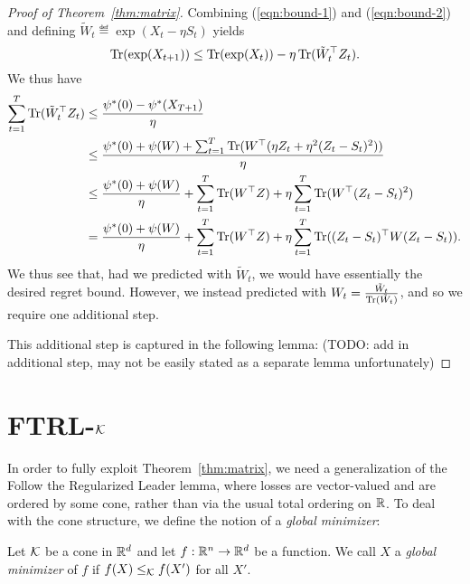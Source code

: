\documentclass[11pt]{article}
\begin{document}
\begin{proof}[Proof of Theorem~\ref{thm:matrix}]
Combining (\ref{eqn:bound-1}) and (\ref{eqn:bound-2}) and defining $\tilde{W}_t \eqdef \exp(X_t - \eta S_t)$ yields
\begin{equation}
\label{eqn:bound-3}
\operatorname{Tr}(\exp(X_{t+1})) \leq \operatorname{Tr}(\exp(X_t)) - \eta \operatorname{Tr}(\tilde{W}_t^{\top}Z_t).
\end{equation}
We thus have
\begin{align}
\sum_{t=1}^T \operatorname{Tr}(\tilde{W}_t^{\top}Z_t) & \leq \frac{\psi^*(0) - \psi^*(X_{T+1})}{\eta} \\
 &\leq \frac{\psi^*(0) + \psi(W) + \sum_{t=1}^T \operatorname{Tr}(W^{\top}(\eta Z_t + \eta^2 (Z_t - S_t)^2))}{\eta} \\
 &\leq \frac{\psi^*(0) + \psi(W)}{\eta} + \sum_{t=1}^T \operatorname{Tr}(W^{\top}Z) + \eta \sum_{t=1}^T \operatorname{Tr}(W^{\top}(Z_t - S_t)^2) \\
 &= \frac{\psi^*(0) + \psi(W)}{\eta} + \sum_{t=1}^T \operatorname{Tr}(W^{\top}Z) + \eta \sum_{t=1}^T \operatorname{Tr}((Z_t-S_t)^{\top}W(Z_t - S_t)).
\end{align}
We thus see that, had we predicted with $\tilde{W}_t$, we would have essentially the desired regret bound. 
However, we instead predicted with $W_t = \frac{\tilde{W}_t}{\operatorname{Tr}(\tilde{W}_t)}$, and so we require one additional step.

This additional step is captured in the following lemma:
(TODO: add in additional step, may not be easily stated as a separate lemma unfortunately)
\end{proof}

\section{FTRL-$\mathcal{K}$}

In order to fully exploit Theorem~\ref{thm:matrix}, we need a 
generalization of the Follow the Regularized Leader lemma, where 
losses are vector-valued and are ordered by some cone, rather than 
via the usual total ordering on $\mathbb{R}$. To deal with the cone structure, 
we define the notion of a \emph{global minimizer}:
\begin{definition}
Let $\mathcal{K}$ be a cone in $\mathbb{R}^d$ and let $f : \mathbb{R}^n \to \mathbb{R}^d$ be a 
function. We call $X$ a \emph{global minimizer} of $f$ if $f(X) \leq_{\mathcal{K}} f(X')$ 
for all $X'$.
\end{definition}
\end{document}
